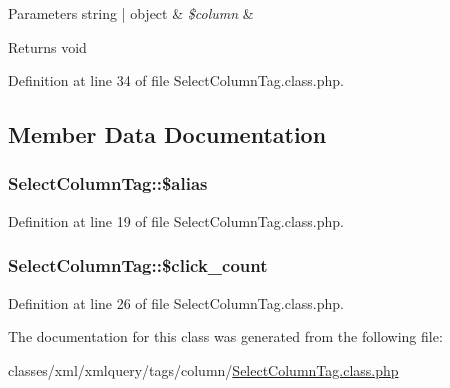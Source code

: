 \begin{DoxyParams}[1]{Parameters}
string | object & {\em \$column} & \\
\hline
\end{DoxyParams}
\begin{DoxyReturn}{Returns}
void 
\end{DoxyReturn}


Definition at line 34 of file Select\-Column\-Tag.\-class.\-php.



\subsection{Member Data Documentation}
\hypertarget{classSelectColumnTag_a152fca9e152d65e4697ad823ffaa101b}{
\subsubsection[{\$alias}]{\setlength{\rightskip}{0pt plus 5cm}Select\-Column\-Tag\-::\$alias}}\label{classSelectColumnTag_a152fca9e152d65e4697ad823ffaa101b}


Definition at line 19 of file Select\-Column\-Tag.\-class.\-php.

\hypertarget{classSelectColumnTag_a5965b8a6c68685c6b99dd88f4fd87f52}{
\subsubsection[{\$click\-\_\-count}]{\setlength{\rightskip}{0pt plus 5cm}Select\-Column\-Tag\-::\$click\-\_\-count}}\label{classSelectColumnTag_a5965b8a6c68685c6b99dd88f4fd87f52}


Definition at line 26 of file Select\-Column\-Tag.\-class.\-php.



The documentation for this class was generated from the following file\-:\begin{DoxyCompactItemize}
\item 
classes/xml/xmlquery/tags/column/\hyperlink{SelectColumnTag_8class_8php}{Select\-Column\-Tag.\-class.\-php}\end{DoxyCompactItemize}
